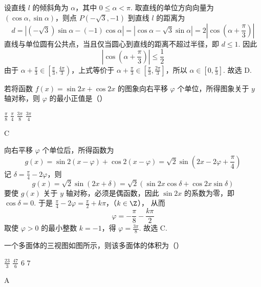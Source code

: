 \begin{solution}
设直线 \(l\) 的倾斜角为 \(\alpha\)，其中 \(0\leqslant\alpha<\pi\). 取直线的单位方向向量为 \((\cos\alpha,\sin\alpha)\)，则点 \(P(-\sqrt{3},-1)\) 到直线 \(l\) 的距离为
\[
d=\left|(-\sqrt{3})\sin\alpha-(-1)\cos\alpha\right|=\left|\cos\alpha-\sqrt{3}\sin\alpha\right|=2\left|\cos\left(\alpha+\frac{\pi}{3}\right)\right|
\]
直线与单位圆有公共点，当且仅当圆心到直线的距离不超过半径，即 \(d\leqslant1\). 因此
\[
\left|\cos\left(\alpha+\frac{\pi}{3}\right)\right|\leqslant\frac12
\]
由于 \(\alpha+\frac{\pi}{3}\in\left[\frac{\pi}{3},\frac{4\pi}{3}\right)\)，上式等价于 \(\alpha+\frac{\pi}{3}\in\left[\frac{\pi}{3},\frac{2\pi}{3}\right]\)，所以 \(\alpha\in\left[0,\frac{\pi}{3}\right]\).
故选 D.
\end{solution}

\begin{problem}
若将函数 \(f(x) = \sin 2x + \cos 2x\) 的图象向右平移 \(\varphi\) 个单位，所得图象关于 \(y\) 轴对称，则 \(\varphi\) 的最小正值是（\quad）

\choices
    {\(\frac{\pi}{8}\)}
    {\(\frac{\pi}{4}\)}
    {\(\frac{3\pi}{8}\)}
    {\(\frac{3\pi}{4}\)}

\begin{answer}
C
\end{answer}
\end{problem}

\begin{solution}
向右平移 \(\varphi\) 个单位后，所得函数为
\[
g(x)=\sin 2(x-\varphi)+\cos 2(x-\varphi)=\sqrt{2}\sin\left(2x-2\varphi+\frac{\pi}{4}\right)
\]
记 \(\delta=\frac{\pi}{4}-2\varphi\)，则
\[
g(x)=\sqrt{2}\sin(2x+\delta)=\sqrt{2}\left(\sin2x\cos\delta+\cos2x\sin\delta\right)
\]
要使 \(g(x)\) 关于 \(y\) 轴对称，必须是偶函数，因此 \(\sin2x\) 的系数为零，即 \(\cos\delta=0\). 于是
\(\frac{\pi}{4}-2\varphi=\frac{\pi}{2}+k\pi\)，（\(k\in\Z\)），
从而
\[
\varphi=-\frac{\pi}{8}-\frac{k\pi}{2}
\]
取使 \(\varphi>0\) 的最小整数 \(k=-1\)，得 \(\varphi=\frac{3\pi}{8}\).
故选 C.
\end{solution}

\begin{problem}
一个多面体的三视图如图所示，则该多面体的体积为（\quad）


\choices
    {\(\frac{23}{3}\)}
    {\(\frac{47}{6}\)}
    {\(6\)}
    {\(7\)}

\begin{answer}
A
\end{answer}
\end{problem}


